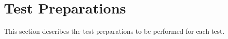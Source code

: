 
\chapter{Test Preparations}
\label{loc:TestPreparations}


This section describes the test preparations to be performed for each test.


\newcommand{\StsTestID}{Test1}%

\DIDINFOOFF%

\renewcommand{\StsTestID}{Test2}%

\DIDINFOON%
